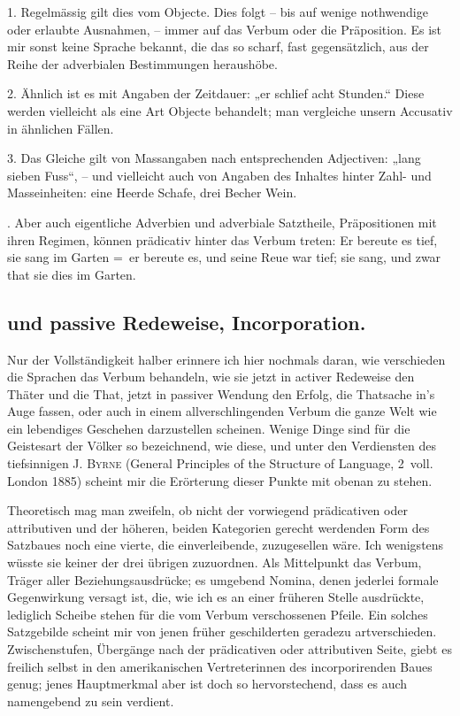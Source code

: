 1. Regelmässig gilt dies vom Objecte. Dies folgt – bis auf wenige nothwendige oder erlaubte Ausnahmen, – immer auf das Verbum oder die Präposition. Es ist mir sonst keine Sprache bekannt, die das  so scharf, fast gegensätzlich, aus der Reihe der adverbialen Bestimmungen heraushöbe.

2. Ähnlich ist es mit Angaben der Zeitdauer: „er schlief acht Stunden.“ Diese werden vielleicht als eine Art Objecte behandelt; man vergleiche unsern Accusativ in ähnlichen Fällen.

3. Das Gleiche gilt von Massangaben nach entsprechenden Adjectiven: „lang sieben Fuss“, – und vielleicht auch von Angaben des Inhaltes hinter Zahl- und Masseinheiten: eine Heerde Schafe, drei Becher Wein.

. Aber auch eigentliche Adverbien und adverbiale Satztheile, Präpositionen mit ihren Regimen, können prädicativ hinter das Verbum treten: Er bereute es tief, sie sang im Garten =~er bereute es, und seine Reue war tief; sie sang, und zwar that sie dies im Garten.
\subsection*{ und passive Redeweise, Incorporation.}\label{IV.IV.Icepsilon} 

Nur der Vollständigkeit halber erinnere ich hier nochmals daran, wie verschieden die Sprachen das Verbum behandeln, wie sie jetzt in activer Redeweise den Thäter und die That, jetzt in passiver Wendung den Erfolg, die Thatsache in’s Auge fassen, oder auch in einem allverschlingenden Verbum die ganze Welt wie ein lebendiges Geschehen darzustellen scheinen. Wenige Dinge sind für die Geistesart der Völker so \label{fp.439} bezeichnend, wie diese, und unter den Verdiensten des tiefsinnigen J. \textsc{Byrne} (General Principles of the Structure of Language, 2~voll. London 1885) scheint mir die Erörterung dieser Punkte mit obenan zu stehen.

Theoretisch mag man zweifeln, ob nicht der vorwiegend prädicativen oder attributiven und der höheren, beiden Kategorien gerecht werdenden Form des Satzbaues noch eine vierte, die einverleibende, zuzugesellen wäre. Ich wenigstens wüsste sie keiner der drei übrigen zuzuordnen. Als Mittelpunkt das Verbum, Träger aller Beziehungsausdrücke; es umgebend Nomina, denen jederlei formale Gegenwirkung versagt ist, die, wie ich es an einer früheren Stelle ausdrückte, lediglich Scheibe stehen für die vom Verbum verschossenen Pfeile. Ein solches Satzgebilde scheint mir von jenen früher geschilderten geradezu artverschieden. \label{sp.460} Zwischenstufen, Übergänge nach der prädicativen oder attributiven Seite, giebt es freilich selbst in den amerikanischen Vertreterinnen des incorporirenden Baues genug; jenes Hauptmerkmal aber ist doch so hervorstechend, dass es auch namengebend zu sein verdient.

